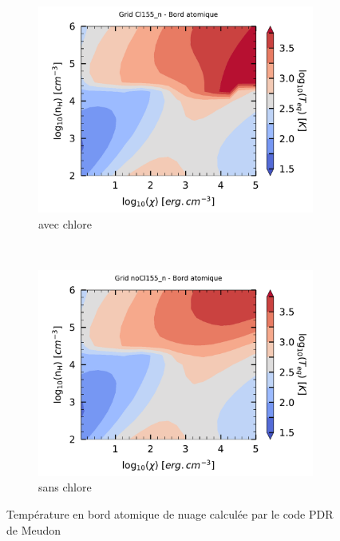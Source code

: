 \begin{figure}[!h]
    \centering
    \begin{subfigure}[t]{0.49\textwidth} %
        \centering \includegraphics[trim = {0 0 0 1cm},clip,width=1\textwidth]{figure/Cl/gridCl155_n/mapTba.pdf}
        \caption{avec chlore}
    \end{subfigure}
    ~ 
    \begin{subfigure}[t]{0.49\textwidth}
        \centering \includegraphics[trim = {0 0 0 1cm},clip,width=1\textwidth]{figure/Cl/gridnoCl155_n/mapTba.pdf}
        \caption{sans chlore}
        \label{fig:Cl:grid:Tba:noCl}
    \end{subfigure}
    \caption{Température en bord atomique de nuage calculée par le code PDR de Meudon}
    \label{fig:Cl:grid:Tba}
\end{figure}



